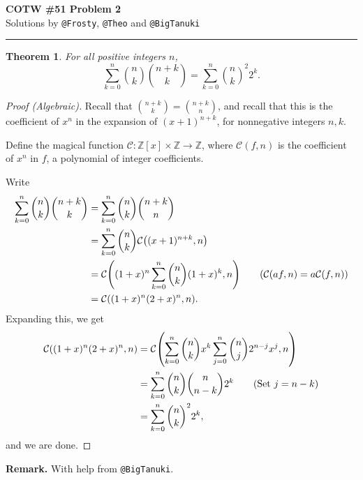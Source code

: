\documentclass[12pt]{article}
\newtheorem*{theorem}{Theorem}
\begin{document}
\begin{center}
	{\Large \textbf{COTW \#51 Problem 2}} \\
	Solutions by \texttt{@Frosty}, \texttt{@Theo} and \texttt{@BigTanuki}
	\rule{\textwidth}{1pt}
\end{center}

\begin{theorem}
	For all positive integers $n$,
	\begin{equation*}
		\boxed{\sum^{n}_{k=0}\binom{n}{k}\binom{n+k}{k}= \sum^{n}_{k=0}\binom{n}{k}^2 2^k.}
	\end{equation*}
\end{theorem}

\begin{proof}[Proof (Algebraic)]
	Recall that $\binom{n+k}{k}=\binom{n+k}{n}$, and recall that this is the coefficient of $x^n$ in the expansion of $(x+1)^{n+k}$, for nonnegative integers $n, k$.

	Define the magical function $\mathcal{C}: \mathbb{Z}[x]\times\mathbb{Z} \to \mathbb{Z}$, where $\mathcal{C}(f, n)$ is the coefficient of $x^n$ in $f$, a polynomial of integer coefficients.

	Write
	\begin{align*}
		\sum^{n}_{k=0}\binom{n}{k}\binom{n+k}{k} & = \sum^{n}_{k=0}\binom{n}{k}\binom{n+k}{n}                                                                   \\
		                                         & = \sum^{n}_{k=0}\binom{n}{k}\mathcal{C}\qty((x+1)^{n+k}, n)                                                  \\
		                                         & = \mathcal{C}\qty((1+x)^n\sum^{n}_{k=0}\binom{n}{k}(1+x)^{k}, n) \tag{$\mathcal{C}(af,n)=a\mathcal{C}(f,n)$} \\
		                                         & = \mathcal{C}\qty((1+x)^n(2+x)^n, n).
	\end{align*}
	Expanding this, we get
	\begin{align*}
		\mathcal{C}\qty((1+x)^n(2+x)^n, n) & = \mathcal{C}\qty(\sum^{n}_{k=0}\binom{n}{k}x^{k}\sum^{n}_{j=0}\binom{n}{j}2^{n-j}x^j, n) \\
		                                   & = \sum^{n}_{k=0}\binom{n}{k}\binom{n}{n-k}2^k \tag{Set $j=n-k$}                           \\
		                                   & = \sum^{n}_{k=0}\binom{n}{k}^2 2^k,
	\end{align*}
	and we are done.
\end{proof}
\textbf{Remark.} With help from \texttt{@BigTanuki}.
\end{document}
